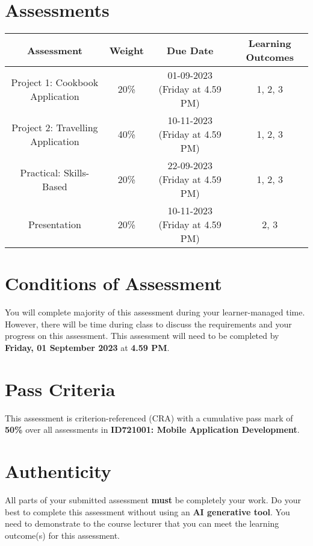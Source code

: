 \documentclass{article}
\begin{document}
\section*{Assessments}
\renewcommand{\arraystretch}{1.5}
\begin{tabular}{|c|c|c|c|}
	\hline
	\textbf{Assessment} & \textbf{Weight} & \textbf{Due Date}    & \textbf{Learning Outcomes} \\ \hline
	Project 1: Cookbook Application            & 20\%            & 01-09-2023 (Friday at 4.59 PM)  & 1, 2, 3                    \\ \hline
	Project 2: Travelling Application            & 40\%            & 10-11-2023 (Friday at 4.59 PM)  & 1, 2, 3                    \\ \hline
	Practical: Skills-Based           & 20\%            & 22-09-2023 (Friday at 4.59 PM)  & 1, 2, 3                    \\ \hline
	Presentation       & 20\%            & 10-11-2023 (Friday at 4.59 PM) & 2, 3                       \\ \hline
\end{tabular}

\section*{Conditions of Assessment}
You will complete majority of this assessment during your learner-managed time. However, there will be time during class to discuss the requirements and your progress on this assessment. This assessment will need to be completed by \textbf{Friday, 01 September 2023} at \textbf{4.59 PM}.

\section*{Pass Criteria}
This assessment is criterion-referenced (CRA) with a cumulative pass mark of \textbf{50\%} over all assessments in \textbf{ID721001: Mobile Application Development}.

\section*{Authenticity}
All parts of your submitted assessment \textbf{must} be completely your work. Do your best to complete this assessment without using an \textbf{AI generative tool}. You need to demonstrate to the course lecturer that you can meet the learning outcome(s) for this assessment. \\
 
\end{document}

